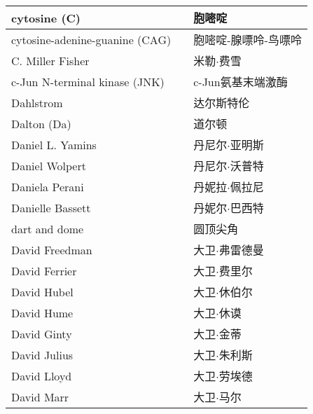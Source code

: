 \begin{longtable}{lll}
	\midrule
	cytosine (C)     &&  胞嘧啶  \\
	
	\midrule
	cytosine-adenine-guanine (CAG)     &&  胞嘧啶-腺嘌呤-鸟嘌呤  \\
	
	\midrule
	C. Miller Fisher     &&  米勒$\cdot$费雪  \\
	
	\midrule
	c-Jun N-terminal kinase (JNK)    &&  c-Jun氨基末端激酶  \\
	
	\midrule
	Dahlstrom   &&  达尔斯特伦  \\
	
	\midrule
	Dalton (Da)   &&  道尔顿  \\
	
	\midrule
	Daniel L. Yamins     &&  丹尼尔$\cdot$亚明斯  \\
	
	\midrule
	Daniel Wolpert     &&  丹尼尔$\cdot$沃普特  \\
	
	\midrule
	Daniela Perani     &&  丹妮拉$\cdot$佩拉尼  \\
	
	\midrule
	Danielle Bassett     &&  丹妮尔$\cdot$巴西特  \\
	
	\midrule
	dart and dome     &&  圆顶尖角  \\
	
	\midrule
	David Freedman     &&  大卫$\cdot$弗雷德曼  \\
	
	\midrule
	David Ferrier     &&  大卫$\cdot$费里尔  \\
	
	\midrule
	David Hubel     &&  大卫$\cdot$休伯尔  \\
	
	\midrule
	David Hume     &&  大卫$\cdot$休谟  \\
	
	\midrule
	David Ginty     &&  大卫$\cdot$金蒂  \\
	
	\midrule
	David Julius     &&  大卫$\cdot$朱利斯  \\
	
	\midrule
	David Lloyd     &&  大卫$\cdot$劳埃德  \\
	
	\midrule
	David Marr     &&  大卫$\cdot$马尔  \\
	

\end{longtable}
